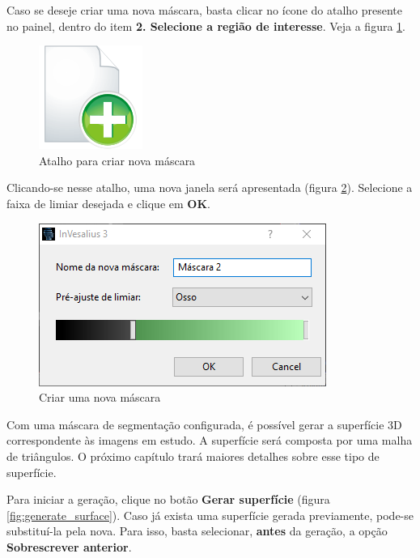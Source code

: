 Caso se deseje criar uma nova máscara, basta clicar no ícone do atalho presente no painel, dentro
do item \textbf{2. Selecione a região de interesse}. Veja a figura \ref{fig:shortcut_new_mask}.

\begin{figure}[!htb]
\centering
\includegraphics[scale=0.2]{../user_guide_figures/icons/object_add_original.png}
\caption{Atalho para criar nova máscara}
\label{fig:shortcut_new_mask}
\end{figure}

Clicando-se nesse atalho, uma nova janela será apresentada (figura \ref{fig:create_new_mask}).
Selecione a faixa de limiar desejada e clique em \textbf{OK}.

\begin{figure}[!htb]
\centering
\includegraphics[scale=0.55]{../user_guide_figures/invesalius_screen/segmentation_threshold_window_dialog_pt.png}
\caption{Criar uma nova máscara}
\label{fig:create_new_mask}
\end{figure}

\newpage

Com uma máscara de segmentação configurada, é possível gerar a superfície 3D correspondente
às imagens em estudo. A superfície será composta por uma malha de triângulos. O próximo capítulo
trará maiores detalhes sobre esse tipo de superfície.

Para iniciar a geração, clique no botão \textbf{Gerar superfície} (figura \ref{fig:generate_surface}).
Caso já exista uma superfície gerada previamente, pode-se substituí-la pela nova. Para isso, basta
selecionar, \textbf{antes} da geração, a opção \textbf{Sobrescrever anterior}.

